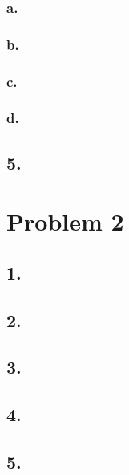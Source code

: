 \documentclass[
]{article}
\begin{document}
\hypertarget{a.}{%
\subsubsection{a.}\label{a.}}

\hypertarget{b.}{%
\subsubsection{b.}\label{b.}}

\hypertarget{c.}{%
\subsubsection{c.}\label{c.}}

\hypertarget{d.}{%
\subsubsection{d.}\label{d.}}

\hypertarget{section-4}{%
\subsection{5.}\label{section-4}}

\hypertarget{problem-2}{%
\section{Problem 2}\label{problem-2}}

\hypertarget{section-5}{%
\subsection{1.}\label{section-5}}

\hypertarget{section-6}{%
\subsection{2.}\label{section-6}}

\hypertarget{section-7}{%
\subsection{3.}\label{section-7}}

\hypertarget{section-8}{%
\subsection{4.}\label{section-8}}

\hypertarget{section-9}{%
\subsection{5.}\label{section-9}}
\end{document}
